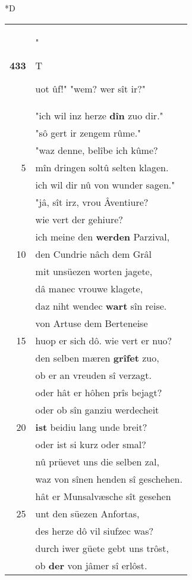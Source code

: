 \documentclass[8pt,a4paper,notitlepage]{article}
\begin{document}
\begin{table}[ht]
\begin{minipage}[t]{0.5\linewidth}
\small
\begin{center}*D
\end{center}
\begin{tabular}{rl}
\textbf{433} & "\begin{large}T\end{large}uot ûf!" "wem? wer sît ir?"\\ 
 & "ich wil inz herze \textbf{dîn} zuo dir."\\ 
 & "sô gert ir zengem rûme."\\ 
 & "waz denne, belîbe ich kûme?\\ 
5 & mîn dringen soltû selten klagen.\\ 
 & ich wil dir nû von wunder sagen."\\ 
 & "jâ, sît irz, vrou Âventiure?\\ 
 & wie vert der gehiure?\\ 
 & ich meine den \textbf{werden} Parzival,\\ 
10 & den Cundrie nâch dem Grâl\\ 
 & mit unsüezen worten jagete,\\ 
 & dâ manec vrouwe klagete,\\ 
 & daz niht wendec \textbf{wart} sîn reise.\\ 
 & von Artuse dem Berteneise\\ 
15 & huop er sich dô. wie vert er nuo?\\ 
 & den selben mæren \textbf{grîfet} zuo,\\ 
 & ob er an vreuden sî verzagt.\\ 
 & oder hât er hôhen prîs bejagt?\\ 
 & oder ob sîn ganziu werdecheit\\ 
20 & \textbf{ist} beidiu lang unde breit?\\ 
 & oder ist si kurz oder smal?\\ 
 & nû prüevet uns die selben zal,\\ 
 & waz von sînen henden sî geschehen.\\ 
 & hât er Munsalvæsche sît gesehen\\ 
25 & unt den süezen Anfortas,\\ 
 & des herze dô vil siufzec was?\\ 
 & durch iwer güete gebt uns trôst,\\ 
 & ob \textbf{der} von jâmer sî erlôst.\\ 

\end{tabular}
\end{minipage}
\end{table}
\end{document}
